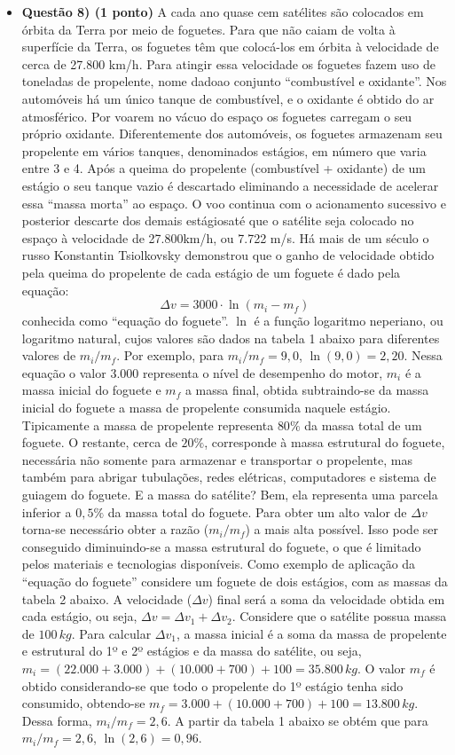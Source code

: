 \documentclass[a4paper, 12pt]{article}
\begin{document}
\begin{flushleft}
\begin{itemize}
        \item \textbf{Questão 8) (1 ponto)} A cada ano quase cem satélites são colocados em órbita da Terra por meio de foguetes. Para que não caiam de volta à superfície da Terra, os foguetes têm que colocá-los em órbita à velocidade de cerca de 27.800 km/h. Para atingir essa velocidade os foguetes fazem uso de toneladas de propelente, nome dadoao conjunto “combustível e oxidante”. Nos automóveis há um único tanque de combustível, e o oxidante é obtido do ar atmosférico. Por voarem no vácuo do espaço os foguetes carregam o seu próprio oxidante. Diferentemente dos automóveis, os foguetes armazenam seu propelente em vários tanques, denominados estágios, em número que varia entre 3 e 4. Após a queima do propelente (combustível + oxidante) de um estágio o seu tanque vazio é descartado eliminando a necessidade de acelerar essa “massa morta” ao espaço. O voo continua com o acionamento sucessivo e posterior descarte dos demais estágiosaté que o satélite seja colocado no espaço à velocidade de 27.800km/h, ou 7.722 m/s. Há mais de um século o russo Konstantin Tsiolkovsky demonstrou que o ganho de velocidade obtido pela queima do propelente de cada estágio de um foguete é dado pela equação: $$\Delta v = 3000 \cdot \ln (m_i - m_f)$$ conhecida como “equação do foguete”. $\ln$ é a função logaritmo neperiano, ou logaritmo natural, cujos valores são dados na tabela 1 abaixo para diferentes valores de $m_i/m_f$. Por exemplo, para $m_i/m_f=9,0$, $\ln(9,0)=2,20$. Nessa equação o valor $3.000$ representa o nível de desempenho do motor, $m_i$ é a massa inicial do foguete e $m_f$ a massa final, obtida subtraindo-se da massa inicial do foguete a massa de propelente consumida naquele estágio. Tipicamente a massa de propelente representa $80\%$ da massa total de um foguete. O restante, cerca de $20\%$, corresponde à massa estrutural do foguete, necessária não somente para armazenar e transportar o propelente, mas também para abrigar tubulações, redes elétricas, computadores e sistema de guiagem do foguete. E a massa do satélite? Bem, ela representa uma parcela inferior a $0,5\%$ da massa total do foguete. Para obter um alto valor de $\Delta v$ torna-se necessário obter a razão ($m_i/m_f$) a mais alta possível. Isso pode ser conseguido diminuindo-se a massa estrutural do foguete, o que é limitado pelos materiais e tecnologias disponíveis. Como exemplo de aplicação da “equação do foguete” considere um foguete de dois estágios, com as massas da tabela 2 abaixo. \linebreak \linebreak A velocidade ($\Delta v$) final será a soma da velocidade obtida em cada estágio, ou seja, $\Delta v =\Delta v_1+\Delta v_2$. Considere que o satélite possua massa de $100 \, kg$. Para calcular $\Delta v_1$, a massa inicial é a soma da massa de propelente e estrutural do 1º e 2º estágios e da massa do satélite, ou seja, $m_i = (22.000 + 3.000) + (10.000 + 700) + 100 = 35.800 \, kg$. O valor $m_f$ é obtido considerando-se que todo o propelente do 1º estágio tenha sido consumido, obtendo-se $m_f= 3.000 + (10.000 + 700) + 100 = 13.800 \, kg$. Dessa forma, $m_i/m_f=2,6$. A partir da tabela 1 abaixo se obtém que para $m_i/m_f=2,6$, $\ln(2,6) = 0,96$. 
\end{itemize}
\end{flushleft}
\end{document}
